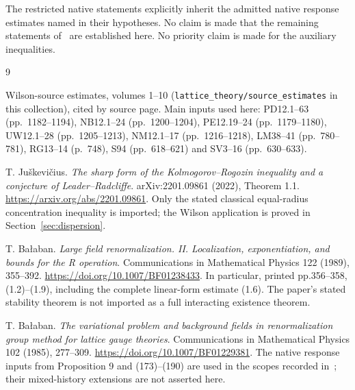 \documentclass[11pt,letterpaper]{article}
\numberwithin{equation}{section}
\theoremstyle{plain}
\theoremstyle{remark}
\begin{document}
 The restricted native statements explicitly inherit the
admitted native response estimates named in their hypotheses. No claim is
made that the remaining statements of~\cite{W} are established here. No priority claim is made for the auxiliary inequalities.

\newpage
\begin{thebibliography}{9}
\raggedright
{}
Wilson-source estimates, volumes 1--10 (\texttt{lattice\_theory/source\_estimates} in this collection), cited by source page.
Main inputs used here: PD12.1--63 (pp.~1182--1194), NB12.1--24 (pp.~1200--1204),
PE12.19--24 (pp.~1179--1180), UW12.1--28 (pp.~1205--1213), NM12.1--17 (pp.~1216--1218),
LM38--41 (pp.~780--781), RG13--14 (p.~748), S94 (pp.~618--621) and SV3--16 (pp.~630--633).

T. Ju\v{s}kevi\v{c}ius.
\emph{The sharp form of the Kolmogorov--Rogozin inequality and a conjecture
of Leader--Radcliffe}. arXiv:2201.09861 (2022), Theorem 1.1.
\url{https://arxiv.org/abs/2201.09861}.
Only the stated classical equal-radius concentration inequality is imported;
the Wilson application is proved in Section~\ref{sec:dispersion}.

T. Ba\l aban.
\emph{Large field renormalization. II. Localization, exponentiation, and
bounds for the R operation}. Communications in Mathematical Physics
122 (1989), 355--392.
\url{https://doi.org/10.1007/BF01238433}.
In particular, printed pp.356--358, (1.2)--(1.9), including the complete
linear-form estimate (1.6). The paper's stated stability theorem is not
imported as a full interacting existence theorem.

T. Ba\l aban.
\emph{The variational problem and background fields in renormalization
group method for lattice gauge theories}. Communications in Mathematical
Physics 102 (1985), 277--309.
\url{https://doi.org/10.1007/BF01229381}.
The native response inputs from Proposition 9 and (173)--(190) are used
in the scopes recorded in~\cite[pp.~1214--1218]{W}; their mixed-history extensions
are not asserted here.

\end{thebibliography}
\end{document}
